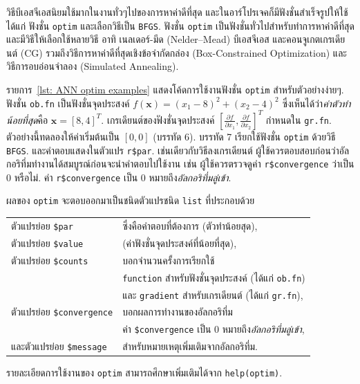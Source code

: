 วิธีบีเอสจีเอสนิยมใช้มากในงานทั่วๆไปของการหาค่าดีที่สุด และในอาร์โปรเจคก็มีฟังชั่นสำเร็จรูปให้ใช้
ได้แก่
ฟังชั่น \texttt{optim} และเลือกวิธีเป็น \texttt{BFGS}.
ฟังชั่น \texttt{optim} เป็นฟังชั่นทั่วไปสำหรับทำการหาค่าดีที่สุด และมีวิธีให้เลือกใช้หลายวิธี อาทิ เนลเดอร์-มีด 
(Nelder–Mead\cite{NelderMead1965a}) บีเอสจีเอส และคอนจูเกตเกรเดียนต์ (CG\cite{FletcherReeves1964a}) รวมถึงวิธีการหาค่าดีที่สุดเชิงข้อจำกัดกล่อง (Box-Constrained Optimization\cite{ByrdEtAl1995a}) และวิธีการอบอ่อนจำลอง (Simulated Annealing\cite{Belisle1992a, KirkpatrickEtAl1983a}).

รายการ~\ref{lst: ANN optim examples} แสดงโค้ดการใช้งานฟังชั่น \texttt{optim} สำหรับตัวอย่างง่ายๆ.
ฟังชั่น \texttt{ob.fn} เป็นฟังชั่นจุดประสงค์ $f(\mathbf{x}) = (x_1 - 8)^2 + (x_2 - 4)^2$
ซึ่งเห็นได้ว่า\textit{ค่าตัวทำน้อยที่สุด}คือ $\mathbf{x} = [8,4]^T$.
เกรเดียนต์ของฟังชั่นจุดประสงค์ $[\frac{\partial f}{\partial x_1}, \frac{\partial f}{\partial x_2}]^T$ กำหนดใน \texttt{gr.fn}.
ตัวอย่างนี้ทดลองให้ค่าเริ่มต้นเป็น $[0,0]$ (บรรทัด 6).
บรรทัด 7 เรียกใช้ฟังชั่น \texttt{optim} ด้วยวิธี \texttt{BFGS}.
และคำตอบแสดงในตัวแปร \texttt{r\$par}.
เช่นเดียวกับวิธีลงเกรเดียนต์ ผู้ใช้ควรตอบสอบก่อนว่าอัลกอริทึ่มทำงานได้สมบูรณ์ก่อนจะนำคำตอบไปใช้งาน 
เช่น ผู้ใช้ควรตรวจดูค่า \texttt{r\$convergence} ว่าเป็น $0$ หรือไม่.
ค่า \texttt{r\$convergence} เป็น $0$ หมายถึง\textit{อัลกอริทึ่มลู่เข้า}.

ผลของ \texttt{optim} จะตอบออกมาเป็นชนิดตัวแปรชนิด \texttt{list} ที่ประกอบด้วย

\begin{tabular}{ll}
ตัวแปรย่อย \texttt{\$par} & ซึ่งคือคำตอบที่ต้องการ (ตัวทำน้อยสุด), \\
ตัวแปรย่อย \texttt{\$value} & (ค่าฟังชั่นจุดประสงค์ที่น้อยที่สุด), \\
ตัวแปรย่อย \texttt{\$counts} & บอกจำนวนครั้งการเรียกใช้ \\
& \texttt{function} สำหรับฟังชั่นจุดประสงค์ (ได้แก่ \texttt{ob.fn}) \\
& และ \texttt{gradient} สำหรับเกรเดียนต์ (ได้แก่ \texttt{gr.fn}), \\
ตัวแปรย่อย \texttt{\$convergence} & บอกผลการทำงานของอัลกอริทึ่ม \\
& ค่า \texttt{\$convergence} เป็น $0$ หมายถึง\textit{อัลกอริทึ่มลู่เข้า}, \\
และตัวแปรย่อย \texttt{\$message} & สำหรับหมายเหตุเพิ่มเติมจากอัลกอริทึ่ม.
\end{tabular} 

รายละเอียดการใช้งานของ \texttt{optim} สามารถศึกษาเพิ่มเติมได้จาก \texttt{help(optim)}.

